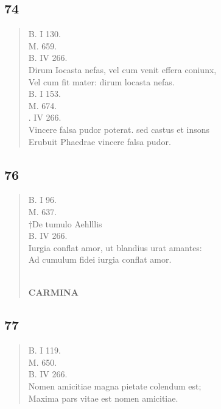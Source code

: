 \documentclass[11pt, a4paper]{report}
\begin{document}
            \subsection*{74}
      \begin{verse}
      B. I 130. \\ M. 659. \\ B. IV 266. \\ Dirum Iocasta nefas, vel cum venit effera coniunx, \\ Vel cum fit mater: dirum locasta nefas. \\ B. I 153. \\ M. 674. \\ . IV 266. \\ Vincere falsa pudor poterat. sed castus et insons \\ Erubuit Phaedrae vincere falsa pudor. \\ 
      \end{verse}
  
            \subsection*{76}
      \begin{verse}
      B. I 96. \\ M. 637. \\ †De tumulo Aehlllis \\ B. IV 266. \\ Iurgia conflat amor, ut blandius urat amantes: \\ Ad cumulum fidei iurgia conflat amor. \\ 
        ﻿\pagebreak 
    \begin{center} \textbf{CARMINA} \end{center} \marginpar{[110]} 
      \end{verse}
  
            \subsection*{77}
      \begin{verse}
      B. I 119. \\ M. 650. \\ B. IV 266. \\ Nomen amicitiae magna pietate colendum est; \\ Maxima pars vitae est nomen amicitiae. \\ 
      \end{verse}
  
\end{document}
